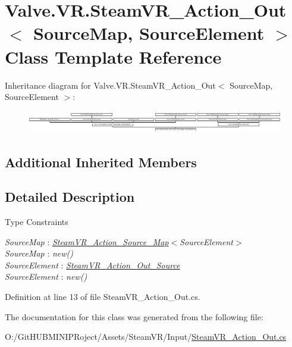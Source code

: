 \hypertarget{class_valve_1_1_v_r_1_1_steam_v_r___action___out}{}\section{Valve.\+V\+R.\+Steam\+V\+R\+\_\+\+Action\+\_\+\+Out$<$ Source\+Map, Source\+Element $>$ Class Template Reference}
\label{class_valve_1_1_v_r_1_1_steam_v_r___action___out}
Inheritance diagram for Valve.\+V\+R.\+Steam\+V\+R\+\_\+\+Action\+\_\+\+Out$<$ Source\+Map, Source\+Element $>$\+:\begin{figure}[H]
\begin{center}
\leavevmode
\includegraphics[height=0.974761cm]{class_valve_1_1_v_r_1_1_steam_v_r___action___out}
\end{center}
\end{figure}
\subsection*{Additional Inherited Members}


\subsection{Detailed Description}
\begin{Desc}
\item[Type Constraints]\begin{description}
\item[{\em Source\+Map} : {\em \mbox{\hyperlink{class_valve_1_1_v_r_1_1_steam_v_r___action___source___map}{Steam\+V\+R\+\_\+\+Action\+\_\+\+Source\+\_\+\+Map}}$<$Source\+Element$>$}]\item[{\em Source\+Map} : {\em new()}]\item[{\em Source\+Element} : {\em \mbox{\hyperlink{class_valve_1_1_v_r_1_1_steam_v_r___action___out___source}{Steam\+V\+R\+\_\+\+Action\+\_\+\+Out\+\_\+\+Source}}}]\item[{\em Source\+Element} : {\em new()}]\end{description}
\end{Desc}


Definition at line 13 of file Steam\+V\+R\+\_\+\+Action\+\_\+\+Out.\+cs.



The documentation for this class was generated from the following file\+:\begin{DoxyCompactItemize}
\item 
O\+:/\+Git\+H\+U\+B\+M\+I\+N\+I\+P\+Roject/\+Assets/\+Steam\+V\+R/\+Input/\mbox{\hyperlink{_steam_v_r___action___out_8cs}{Steam\+V\+R\+\_\+\+Action\+\_\+\+Out.\+cs}}\end{DoxyCompactItemize}
